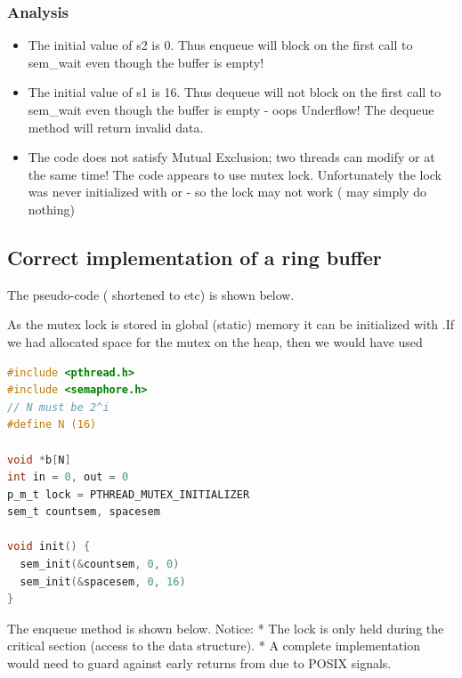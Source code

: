\subsubsection{Analysis}\label{analysis-1}

\begin{itemize}
\tightlist
\item
  The initial value of s2 is 0. Thus enqueue will block on the first call to sem\_wait even though the buffer is empty!
\item
  The initial value of s1 is 16. Thus dequeue will not block on the first call to sem\_wait even though the buffer is empty - oops Underflow! The dequeue method will return invalid data.
\item
  The code does not satisfy Mutual Exclusion; two threads can modify  or  at the same time! The code appears to use mutex lock. Unfortunately the lock was never initialized with  or  - so the lock may not work ( may simply do nothing)
\end{itemize}

\subsection{Correct implementation of a ring buffer}\label{correct-implementation-of-a-ring-buffer}

The pseudo-code ( shortened to  etc) is shown below.

As the mutex lock is stored in global (static) memory it can be initialized with .If we had allocated space for the mutex on the heap, then we would have used 

\begin{lstlisting}[language=C]
#include <pthread.h>
#include <semaphore.h>
// N must be 2^i
#define N (16)

void *b[N]
int in = 0, out = 0
p_m_t lock = PTHREAD_MUTEX_INITIALIZER
sem_t countsem, spacesem

void init() {
  sem_init(&countsem, 0, 0)
  sem_init(&spacesem, 0, 16)
}
\end{lstlisting}

The enqueue method is shown below. Notice: * The lock is only held during the critical section (access to the data structure). * A complete implementation would need to guard against early returns from  due to POSIX signals.

